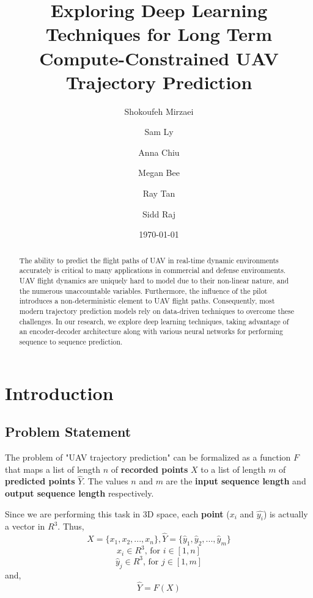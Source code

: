 \documentclass{article}
\begin{document}
\title{
    Exploring Deep Learning Techniques for Long Term Compute-Constrained UAV Trajectory Prediction
}

\author{
    Shokoufeh Mirzaei
    \and Sam Ly
    \and Anna Chiu
    \and Megan Bee
    \and Ray Tan
    \and Sidd Raj
}

\date{\today}

\maketitle

\begin{abstract}
    The ability to predict the flight paths of UAV in real-time dynamic 
    environments accurately is critical to many applications in commercial and 
    defense environments. UAV flight dynamics are uniquely hard to model due to 
    their non-linear nature, and the numerous unaccountable variables. 
    Furthermore, the influence of the pilot introduces a non-deterministic 
    element to UAV flight paths. Consequently, most  modern trajectory 
    prediction models rely on data-driven techniques to overcome these 
    challenges. In our research, we explore deep learning techniques, taking 
    advantage of an encoder-decoder architecture along with various neural 
    networks for performing sequence to sequence prediction. 
\end{abstract}


\section{Introduction}
\subsection{Problem Statement}
The problem of "UAV trajectory prediction" can be formalized as a function $F$ 
that maps a list of length $n$ of \textbf{recorded points} $X$ to a list of 
length $m$ of \textbf{predicted points} $\hat{Y}$. The values $n$ and $m$ are the 
\textbf{input sequence length} and \textbf{output sequence length} respectively.

Since we are performing this task in 3D space, each \textbf{point} ($x_i$ and 
$\hat{y_i}$) is actually a vector in $R^3$. Thus,
$$ X = \{x_1, x_2, ..., x_n\}, \hat{Y} = \{\hat{y}_1, \hat{y}_2, ..., \hat{y}_m\} $$ 
$$ x_i \in R^3 \text{, for } i \in [1, n]$$
$$\hat{y}_j \in R^3 \text{, for } j \in [1, m]$$
and,
$$ \hat{Y} = F(X) $$
\end{document}
